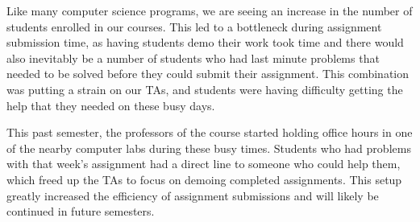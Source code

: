 Like many computer science programs, we are seeing an increase in the number of students enrolled in our courses. This led to a bottleneck during assignment submission time, as having students demo their work took time and there would also inevitably be a number of students who had last minute problems that needed to be solved before they could submit their assignment. This combination was putting a strain on our TAs, and students were having difficulty getting the help that they needed on these busy days.

This past semester, the professors of the course started holding office hours in one of the nearby computer labs during these busy times. Students who had problems with that week's assignment had a direct line to someone who could help them, which freed up the TAs to focus on demoing completed assignments. This setup greatly increased the efficiency of assignment submissions and will likely be continued in future semesters.
